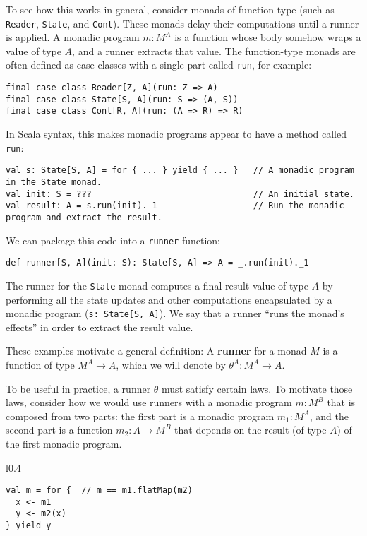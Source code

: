 To see how this works in general, consider monads of function type
(such as \lstinline!Reader!, \lstinline!State!, and \lstinline!Cont!).
These monads delay their computations until a runner is applied. A
monadic program $m:M^{A}$ is a function whose body somehow wraps
a value of type $A$, and a runner extracts that value. The function-type
monads are often defined as case classes with a single part called
\lstinline!run!, for example:
\begin{lstlisting}
final case class Reader[Z, A](run: Z => A)
final case class State[S, A](run: S => (A, S))
final case class Cont[R, A](run: (A => R) => R)
\end{lstlisting}
In Scala syntax, this makes monadic programs appear to have a method
called \lstinline!run!:
\begin{lstlisting}
val s: State[S, A] = for { ... } yield { ... }   // A monadic program in the State monad.
val init: S = ???                                // An initial state.
val result: A = s.run(init)._1                   // Run the monadic program and extract the result.
\end{lstlisting}
We can package this code into a \lstinline!runner! function:
\begin{lstlisting}
def runner[S, A](init: S): State[S, A] => A = _.run(init)._1
\end{lstlisting}
The runner for the \lstinline!State! monad computes a final result
value of type $A$ by performing all the state updates and other computations
encapsulated by a monadic program (\lstinline!s: State[S, A]!). We
say that a runner \textsf{``}runs the monad\textsf{'}s effects\textsf{''} in order to extract
the result value.

These examples motivate a general definition: A \textbf{runner}
for a monad $M$ is a function of type $M^{A}\rightarrow A$, which
we will denote by $\theta^{A}:M^{A}\rightarrow A$.

To be useful in practice, a runner $\theta$ must satisfy certain
laws. To motivate those laws, consider how we would use runners with
a monadic program $m:M^{B}$ that is composed from two parts: the
first part is a monadic program $m_{1}:M^{A}$, and the second part
is a function $m_{2}:A\rightarrow M^{B}$ that depends on the result
(of type $A$) of the first monadic program.

\begin{wrapfigure}{l}{0.4\columnwidth}%
\vspace{-0.85\baselineskip}

\begin{lstlisting}
val m = for {  // m == m1.flatMap(m2)
  x <- m1
  y <- m2(x)
} yield y
\end{lstlisting}
\vspace{-0.6\baselineskip}
\end{wrapfigure}%

